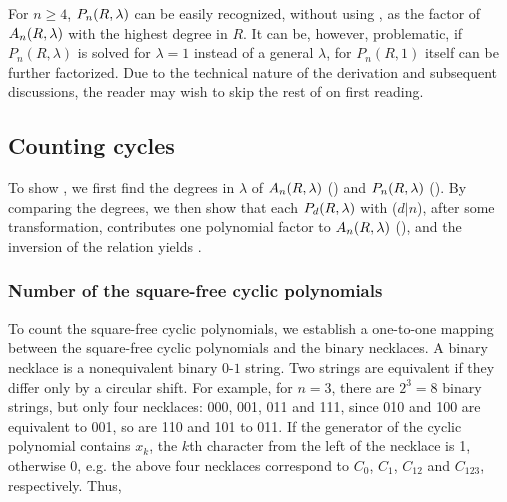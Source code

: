 \documentclass{ws-ijbc}
\begin{document}
For $n \ge 4$,
  $P_n(R, \lambda)$ can be easily recognized,
  without using ,
  as the factor of $A_n(R, \lambda)$
  with the highest degree in $R$.
It can be, however, problematic,
   if $P_n(R, \lambda)$ is solved for $\lambda = 1$
   instead of a general $\lambda$,
   for $P_n(R, 1)$ itself can be further factorized.
%
Due to the technical nature of the derivation and subsequent discussions,
  the reader may wish to skip the rest of 
  on first reading.






\subsection{\label{sec:degprimfac}Counting cycles}



%
To show , we first find the degrees in $\lambda$ of
  $A_n(R, \lambda)$ () and $P_n(R, \lambda)$ ().
By comparing the degrees,
  we then show that each $P_d(R, \lambda)$ with ($d|n$),
  after some transformation,
  contributes one polynomial factor to $A_n(R, \lambda)$
  (),
  and the inversion of the relation
  yields .



\subsubsection{Number of the square-free cyclic polynomials}

To count the square-free cyclic polynomials,
  we establish a one-to-one mapping
  between the square-free cyclic polynomials
  and the binary necklaces.
%
A binary necklace
  is a nonequivalent binary $0$-$1$ string.
%
Two strings are equivalent if they differ only by a circular shift.
%
For example, for $n = 3$, there are $2^3 = 8$ binary strings,
but only four necklaces: 000, 001, 011 and 111,
since 010 and 100 are equivalent to 001,
so are 110 and 101 to 011.
%
If the generator of the cyclic polynomial contains $x_k$,
  the $k$th character from the left of the necklace is 1,
  otherwise 0,
e.g. the above four necklaces correspond to
  $C_0$, $C_1$, $C_{12}$ and $C_{123}$, respectively.
Thus,
\end{document}
